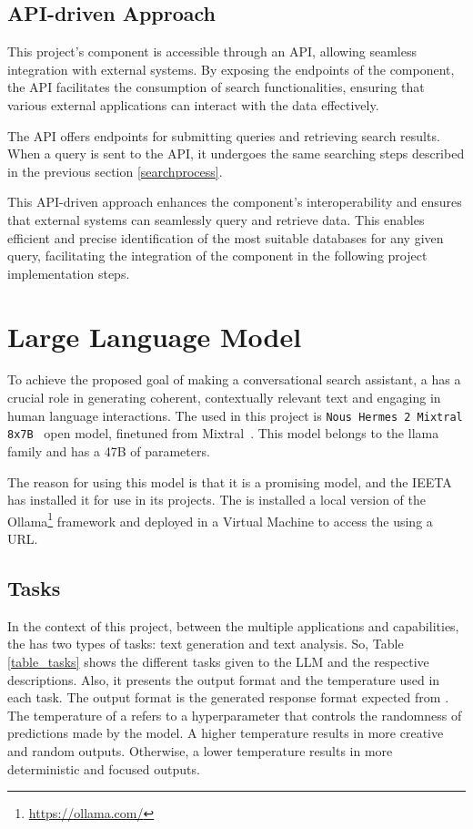 \subsection{API-driven Approach}

This project's {\ir} component is accessible through an API, allowing seamless integration with external systems. By exposing the endpoints of the {\ir} component, the API facilitates the consumption of search functionalities, ensuring that various external applications can interact with the data effectively.

The API offers endpoints for submitting queries and retrieving search results. When a query is sent to the API, it undergoes the same searching steps described in the previous section \ref{searchprocess}.

This API-driven approach enhances the {\ir} component's interoperability and ensures that external systems can seamlessly query and retrieve data. This enables efficient and precise identification of the most suitable databases for any given query, facilitating the integration of the {\ir} component in the following project implementation steps.




\section{Large Language Model}
\label{sec:llm}

To achieve the proposed goal of making a conversational search assistant, a {\llm} has a crucial role in generating coherent, contextually relevant text and engaging in human language interactions. The {\llm} used in this project is \texttt{Nous Hermes 2 Mixtral 8x7B}~\cite{Nous-Hermes-2-Mixtral-8x7B-DPO} open model, finetuned from Mixtral~\cite{jiang2024a}. This model belongs to the llama family and has a 47B of parameters. 

The reason for using this {\llm} model is that it is a promising model, and the IEETA has installed it for use in its projects. The {\llm} is installed a local version of the Ollama\footnote{\url{https://ollama.com/}} framework and deployed in a Virtual Machine to access the {\llm} using a URL. 


\subsection{Tasks}

In the context of this project, between the multiple applications and capabilities, the {\llm} has two types of tasks: text generation and text analysis. So, Table \ref{table_tasks} shows the different tasks given to the LLM and the respective descriptions. Also, it presents the output format and the temperature used in each task. The output format is the generated response format expected from {\llm}. The temperature of a {\llm} refers to a hyperparameter that controls the randomness of predictions made by the model. A higher temperature results in more creative and random outputs. Otherwise, a lower temperature results in more deterministic and focused outputs.

